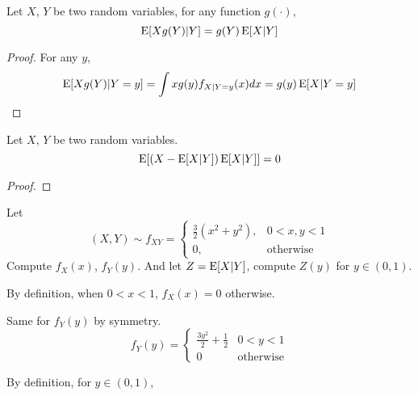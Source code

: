 \begin{lemma}
	Let $X$, $Y$ be two random variables, for any function $g(\cdot)$,
	$$ \operatorname{E}[Xg(Y)|Y] = g(Y)\operatorname{E}[X|Y]$$
\end{lemma}
\begin{proof}
	For any $y$,
	$$ \operatorname{E}[Xg(Y)|Y = y] = \int xg(y) f_{X|Y=y}(x) dx = g(y) \operatorname{E}[X|Y=y]$$
\end{proof}

\begin{lemma}
	Let $X$, $Y$ be two random variables.
	$$\operatorname{E}[(X-\operatorname{E}[X|Y])\operatorname{E}[X|Y]] = 0$$
\end{lemma}
\begin{proof}
	\als{
		\E[(X-\E[X|Y])\E[X|Y]] &= \E[X\E[X|Y]] - \E[\E[X|Y]^2]\\
						 	   &= \E[\E[X\E[X|Y]|Y]] - \E[\E[X|Y]^2]\\
						 	   &= \E[\E[X|Y]^2]- \E[\E[X|Y]^2]
	}
\end{proof}

\begin{excr}{}
	Let $$
	(X, Y) \sim f_{XY} = \begin{cases} \frac{3}{2} (x^2+y^2), & 0<x,y<1\\
		0, & \textrm{otherwise}
		\end{cases}
	$$ 
	Compute $f_X(x)$, $f_Y(y)$. And let $Z=\operatorname{E}[X|Y]$, compute $Z(y)$ for $y\in (0,1)$. 
\end{excr}
\begin{soln}{}
	By definition, when $0<x<1$,
	$f_X(x) = 0$ otherwise.
	
	Same for $f_Y(y)$ by symmetry.
	$$ f_Y(y) = \begin{cases}
		\frac{3y^2}{2}+\frac{1}{2} & 0<y<1\\
		0 & \textrm{otherwise}
	\end{cases}$$

	By definition, for $y\in (0,1)$,
\end{soln}

